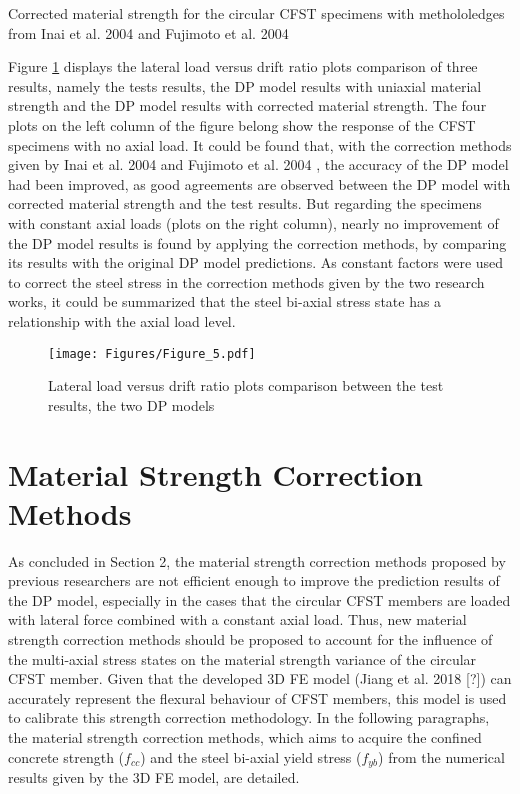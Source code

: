 \documentclass[12pt,a4]{article}
\begin{document}
	\par
	\begin{table}[h]
		\centering
		\caption{Corrected material strength for the circular CFST specimens with methololedges from Inai et al. 2004 \cite{RN30} and Fujimoto et al. 2004 \cite{RN15}}
		
		\label{tb-1}
	\end{table}
	\par
	Figure \ref{fig-4} displays the lateral load versus drift ratio plots comparison of three results, namely the tests results, the DP model results with uniaxial material strength and the DP model results with corrected material strength. The four plots on the left column of the figure belong show the response of the CFST specimens with no axial load. It could be found that, with the correction methods given by Inai et al. 2004 \cite{RN30} and Fujimoto et al. 2004 \cite{RN15}, the accuracy of the DP model had been improved, as good agreements are observed between the DP model with corrected material strength and the test results. But regarding the specimens with constant axial loads (plots on the right column), nearly no improvement of the DP model results is found by applying the correction methods, by comparing its results with the original DP model predictions. As constant factors were used to correct the steel stress in the correction methods given by the two research works, it could be summarized that the steel bi-axial stress state has a relationship with the axial load level.
	\par
	\begin{figure}[h]
		\centering
		\texttt{[image: Figures/Figure\_5.pdf]}
		\caption{Lateral load versus drift ratio plots comparison between the test results, the two DP models}
		\label{fig-4}
	\end{figure}
	\par
	\section{Material Strength Correction Methods}
	As concluded in Section 2, the material strength correction methods proposed by previous researchers are not efficient enough to improve the prediction results of the DP model, especially in the cases that the circular CFST members are loaded with lateral force combined with a constant axial load. Thus, new material strength correction methods should be proposed to account for the influence of the multi-axial stress states on the material strength variance of the circular CFST member. Given that the developed 3D FE model (Jiang et al. 2018 [?]) can accurately represent the flexural behaviour of CFST members, this model is used to calibrate this strength correction methodology. In the following paragraphs, the material strength correction methods, which aims to acquire the confined concrete strength ($f_{cc}$) and the steel bi-axial yield stress ($f_{yb}$) from the numerical results given by the 3D FE model, are detailed.
	\par
	
\end{document}

